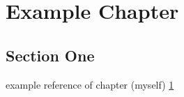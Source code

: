 \chapter{Example Chapter}%
\label{chap:chap1} %




\section{Section One}
\label{section:chap1:sec1}

example reference of chapter (myself)
\ref{chap:chap1}

  





 

 
